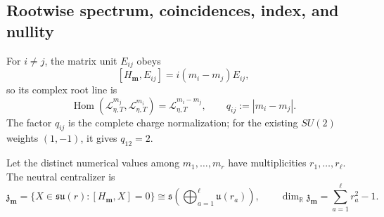 \subsection{Rootwise spectrum, coincidences, index, and nullity}

For \(i\ne j\), the matrix unit \(E_{ij}\) obeys
\[
 [H_{\mathbf m},E_{ij}]=i(m_i-m_j)E_{ij},
\]
so its complex root line is
\begin{equation}
 \operatorname{Hom}(\mathscr L_{\eta,T}^{m_j},
                     \mathscr L_{\eta,T}^{m_i})
 =\mathscr L_{\eta,T}^{m_i-m_j},
 \qquad q_{ij}:=|m_i-m_j|.
 \label{cusp-native-full-flux-suN-root-charge}
\end{equation}
The factor \(q_{ij}\) is the complete charge normalization; for the existing
\(SU(2)\) weights \((1,-1)\), it gives \(q_{12}=2\).

Let the distinct numerical values among \(m_1,\ldots,m_r\) have
multiplicities \(r_1,\ldots,r_\ell\).  The neutral centralizer is
\begin{equation}
 \mathfrak z_{\mathbf m}
 =\{X\in\mathfrak{su}(r):[H_{\mathbf m},X]=0\}
 \cong\mathfrak s\!\left(\bigoplus_{a=1}^{\ell}\mathfrak u(r_a)\right),
 \qquad
 \dim_{\mathbb R}\mathfrak z_{\mathbf m}
 =\sum_{a=1}^{\ell}r_a^2-1.
 \label{cusp-native-full-flux-suN-centralizer}
\end{equation}

